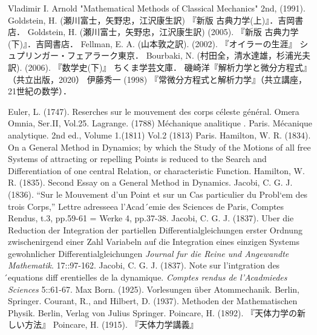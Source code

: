 \documentclass[uplatex, dvipdfmx]{jsreport}
\begin{document}
\begin{thebibliography}{99}
    Vladimir I. Arnold "Mathematical Methods of Classical Mechanics" 2nd, (1991).
    Goldstein, H. (瀬川富士，矢野忠，江沢康生訳) 『新版 古典力学(上)』．吉岡書店．
    Goldstein, H. (瀬川富士，矢野忠，江沢康生訳) (2005). 『新版 古典力学(下)』．吉岡書店．
    Fellman, E. A. (山本敦之訳). (2002). 『オイラーの生涯』 シュプリンガー・フェアラーク東京．
    Bourbaki, N. (村田全，清水達雄，杉浦光夫訳). (2006). 『数学史(下)』 ちくま学芸文庫．
    磯崎洋『解析力学と微分方程式』（共立出版，2020）
    伊藤秀一 (1998) 『常微分方程式と解析力学』（共立講座，21世紀の数学）．

    Euler, L. (1747). Reserches sur le mouvement des corps céleste général. Omera Omnia, Ser.II, Vol.25.
    Lagrange. (1788) Méchanique analitique . Paris.
    Mécanique analytique. 2nd ed., Volume 1.(1811) Vol.2 (1813) Paris.
    Hamilton, W. R. (1834). On a General Method in Dynamics; by which the Study of the Motions of all
    free Systems of attracting or repelling Points is reduced to the Search and Differentiation
    of one central Relation, or characteristic Function.
    Hamilton, W. R. (1835). Second Essay on a General Method in Dynamics.
    Jacobi, C. G. J. (1836).
    “Sur le Mouvement d’un Point et sur un Cas particulier du Probl`em des trois Corps,” Lettre adresseea l’Acad´emie des Sciences de Paris, Comptes Rendus, t.3, pp.59-61 = Werke 4, pp.37-38.
    Jacobi, C. G. J. (1837). Uber die Reduction der Integration der partiellen Differentialgleichungen erster Ordnung zwischenirgend einer Zahl Variabeln auf die Integration eines einzigen Systems gewohnlicher Differentialgleichungen \textit{Journal fur die Reine und Angewandte Mathematik}. 17::97-162.
    Jacobi, C. G. J. (1837). Note sur l’intgration des ́equations diff erentielles de la dynamique. \textit{Comptes rendus de l’Acadmiedes Sciences} 5::61-67.
    Max Born. (1925). Vorlesungen über Atommechanik. Berlin, Springer.
    Courant, R., and Hilbert, D. (1937). Methoden der Mathematischen Physik. Berlin, Verlag von Julius Springer.
    Poincare, H. (1892). 『天体力学の新しい方法』
    Poincare, H. (1915). 『天体力学講義』
\end{thebibliography}
\end{document}
